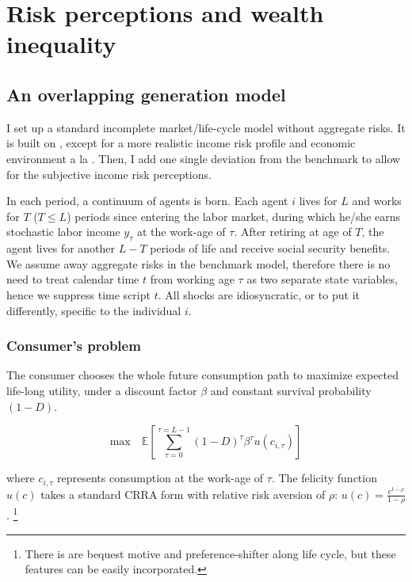 \hypertarget{model_pe}{%
\section{Risk perceptions and wealth inequality}\label{model_pe}}

\subsection{An overlapping generation model}


I set up a standard incomplete market/life-cycle model without aggregate risks. It is built on \cite{huggett1996wealth}, except for  a more realistic income risk profile and economic environment a la \cite{krueger2016macroeconomics,carroll2017distribution}. Then, I add one single deviation from the benchmark to allow for the subjective income risk perceptions. 

In each period, a continuum of agents is born. Each agent $i$ lives for $L$ and works for $T$ ($T\leq L$) periods since entering the labor market, during which he/she earns stochastic labor income \(y_\tau\) at the
work-age of \(\tau\). After retiring at age of \(T\), the agent lives
for another \(L-T\) periods of life and receive social security benefits. We assume away aggregate risks in the benchmark model, therefore there is no need to treat calendar time $t$ from working age $\tau$ as two separate state variables, hence we suppress time script $t$. All shocks are idiosyncratic, or to put it differently, specific to the individual $i$. 


\subsubsection{Consumer's problem}

The consumer chooses the whole future consumption path to maximize
expected life-long utility, under a discount factor $\beta$ and constant survival probability $(1-D)$. 

\begin{equation}
\textrm{max}\quad  \mathbb{E}\left[\sum^{\tau=L-1}_{\tau=0}(1-D)^\tau\beta^\tau u(c_{i,\tau})\right] 
\end{equation}


where $c_{i,\tau}$ represents consumption at the work-age of $\tau$. The
felicity function $u(c)$ takes a standard CRRA form with relative risk
aversion of $\rho$: $u(c) = \frac{c^{1-\rho}}{1-\rho}$.  \footnote{There is are bequest motive and
preference-shifter along life cycle, but these features can be easily incorporated.}



